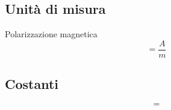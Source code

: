 \subsection{Unità di misura}
Polarizzazione magnetica
    \begin{equation} [M] = \frac{A}{m} \label{}\end{equation}


\subsection{Costanti}

    \begin{equation}  =  \label{}\end{equation}
